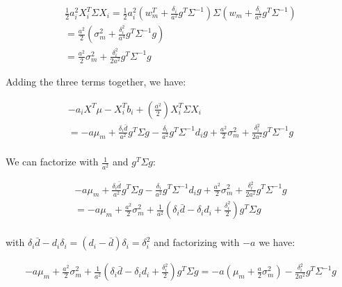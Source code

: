 \begin{equation}
    \begin{aligned}
    \frac{1}{2}a_i^2 X_i^T \Sigma X_i = \frac{1}{2}a_i^2 (w_m^T + \frac{\delta_i}{a^2} g^T \Sigma^{-1}) \Sigma (w_m + \frac{\delta_i}{a^2} g^T \Sigma^{-1}) \\
        = \frac{a^2}{2}(\sigma^2_m + \frac{\delta_i^2}{a^4} g^T \Sigma^{-1} g) \\
        = \frac{a^2}{2} \sigma^2_m + \frac{\delta_i^2}{2a^2} g^T \Sigma^{-1} g
    \end{aligned}
\end{equation}

Adding the three terms together, we have:

\begin{equation}
    \begin{aligned}
        -a_i X^T \mu - X_i^T b_i + (\frac{a^2}{2})X_i^T \Sigma X_i \\
        = -a \mu_m + \frac{\delta_i \bar{d}}{a^2} g^T \Sigma g -  \frac{\delta_i}{a^2} g^T \Sigma^{-1} d_i g + \frac{a^2}{2} \sigma^2_m + \frac{\delta_i^2}{2a^2} g^T \Sigma^{-1} g \\
    \end{aligned}
\end{equation}

We can factorize with $\frac{1}{a^2}$ and $g^T \Sigma g$:

\begin{equation}
    \begin{aligned}
        -a \mu_m + \frac{\delta_i \bar{d}}{a^2} g^T \Sigma g -  \frac{\delta_i}{a^2} g^T \Sigma^{-1} d_i g + \frac{a^2}{2} \sigma^2_m + \frac{\delta_i^2}{2a^2} g^T \Sigma^{-1} g \\
        = -a \mu_m + \frac{a^2}{2} \sigma^2_m + \frac{1}{a^2} ( \delta_i \bar{d} - \delta_i d_i + \frac{\delta_i^2}{2}) g^T \Sigma g\\
    \end{aligned}
\end{equation}

with $\delta_i \bar{d} - d_i \delta_i = (d_i - \bar{d})\delta_i = \delta_i^2$ and 
factorizing with $-a$ we have:

\begin{equation}
    \begin{aligned}
        -a \mu_m + \frac{a^2}{2} \sigma^2_m + \frac{1}{a^2} ( \delta_i \bar{d} - \delta_i d_i + \frac{\delta_i^2}{2}) g^T \Sigma g = -a(\mu_m + \frac{a}{2}\sigma^2_m) - \frac{\delta_i^2}{2a^2}g^T \Sigma^{-1} g\\
    \end{aligned}
\end{equation}

